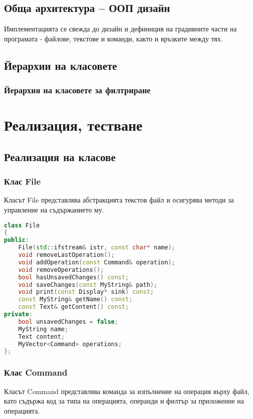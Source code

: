 \documentclass[a4paper,12pt]{article}
\begin{document}
\subsection{Обща архитектура – ООП дизайн}
Имплементацията се свежда до дизайн и дефиниция на градивните части на програмата - файлове, текстове и команди, както и връзките между тях.


\subsection{Йерархии на класовете}

\subsubsection{Йерархия на класовете за филтриране}
\begin{figure}[h]
    \label{fig:system-diagram}
\end{figure}


\section{Реализация, тестване}
\subsection{Реализация на класове}
\subsubsection{Клас File}
Класът File представлява абстракцията текстов файл и осигурява методи за управление на съдържанието му.

\begin{lstlisting}[language=C++]
class File
{
public:
    File(std::ifstream& istr, const char* name);
    void removeLastOperation();
    void addOperation(const Command& operation);
    void removeOperations();
    bool hasUnsavedChanges() const;
    void saveChanges(const MyString& path);
    void print(const Display* sink) const;
    const MyString& getName() const;
    const Text& getContent() const;
private:
    bool unsavedChanges = false;
    MyString name;
    Text content;
    MyVector<Command> operations;
};
\end{lstlisting}

\subsubsection{Клас Command}
Класът Command представлява команда за изпълнение на операция върху файл, като съдържа код за типа на операцията, операнди и филтър за приложение на операцията.
\end{document}
